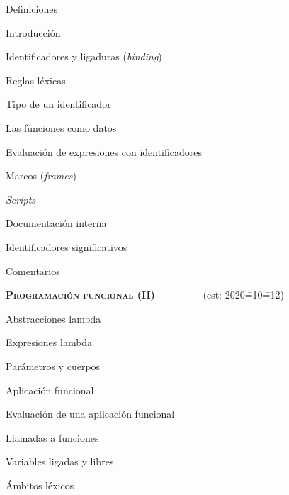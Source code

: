 \begin{longenum}
\begin{longenum}
        \item Definiciones
        \begin{longenum}
            \item Introducción
            \item Identificadores y ligaduras (\textit{binding})
            \begin{longenum}
                \item Reglas léxicas
                \item Tipo de un identificador
                \item Las funciones como datos
            \end{longenum}
            \item Evaluación de expresiones con identificadores
            \item Marcos (\textit{frames})
            \item \textit{Scripts}
        \end{longenum}
        \item Documentación interna
        \begin{longenum}
            \item Identificadores significativos
            \item Comentarios
        \end{longenum}
    \end{longenum}
    \item \textbf{\textsc{Programación funcional (II)}} \ \ \ \ \ \ \ \ \ (est: 2020\==10\==12)
    \begin{longenum}
        \item Abstracciones lambda
        \begin{longenum}
            \item Expresiones lambda
            \item Parámetros y cuerpos
            \item Aplicación funcional
            \begin{longenum}
                \item Evaluación de una aplicación funcional
                \item Llamadas a funciones
            \end{longenum}
            \item Variables ligadas y libres
        \end{longenum}
        \item Ámbitos léxicos

\end{longenum}
\end{longenum}
